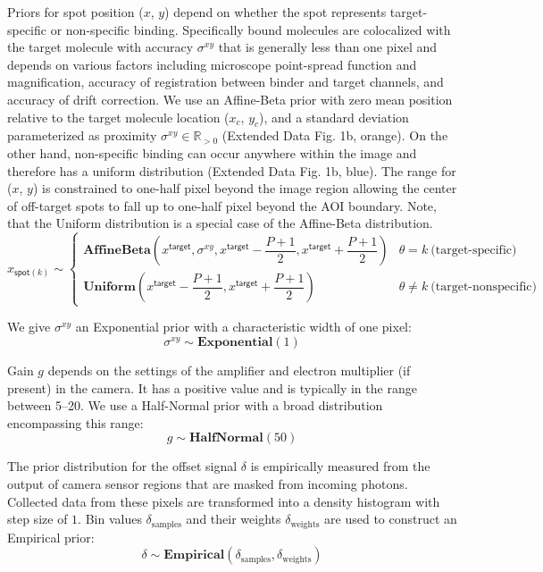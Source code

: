 Priors for spot position ($x$, $y$) depend on whether the spot represents target-specific or non-specific binding. Specifically bound molecules are colocalized with the target molecule with accuracy $\sigma^{xy}$ that is generally less than one pixel and depends on various factors including microscope point-spread function and magnification, accuracy of registration between binder and target channels, and accuracy of drift correction. We use an Affine-Beta prior with zero mean position relative to the target molecule location ($x_c$, $y_c$), and a standard deviation parameterized as proximity $\sigma^{xy} \in \mathbb{R}_{>0} $ (Extended Data Fig. 1b, orange). On the other hand, non-specific binding can occur anywhere within the image and therefore has a uniform distribution (Extended Data Fig. 1b, blue).  The range for ($x$, $y$) is constrained to one-half pixel beyond the image region allowing the center of off-target spots to fall up to one-half pixel beyond the AOI boundary. Note, that the Uniform distribution is a special case of the Affine-Beta distribution.
%
\begin{equation}
    x_{\mathsf{spot}(k)} \sim
    \begin{cases}
        \mathbf{AffineBeta}\left( x^\mathsf{target}, \sigma^{xy}, x^\mathsf{target}-\dfrac{P+1}{2}, x^\mathsf{target}+\dfrac{P+1}{2} \right) & \theta = k ~\textrm{(target-specific)} \\
        \mathbf{Uniform}\left(x^\mathsf{target}-\dfrac{P+1}{2}, x^\mathsf{target}+\dfrac{P+1}{2} \right) & \theta \neq k ~\text{(target-nonspecific)}
    \end{cases}
\end{equation}

We give $\sigma^{xy}$ an Exponential prior with a characteristic width of one pixel:
%
\begin{equation}
    \sigma^{xy} \sim \mathbf{Exponential}(1)
\end{equation}

Gain $g$ depends on the settings of the amplifier and electron multiplier (if present) in the camera. It has a positive value and is typically in the range between 5--20. We use a Half-Normal prior with a broad distribution encompassing this range:
%
\begin{equation}
    g \sim \mathbf{HalfNormal}(50)
\end{equation}

The prior distribution for the offset signal $\delta$ is empirically measured from the output of camera sensor regions that are masked from incoming photons. Collected data from these pixels are transformed into a density histogram with step size of $1$. Bin values $\delta_\mathrm{samples}$ and their weights $\delta_\mathrm{weights}$ are used to construct an Empirical prior:
%
\begin{equation}
    \delta \sim \mathbf{Empirical}(\delta_\mathrm{samples}, \delta_\mathrm{weights})
\end{equation}

